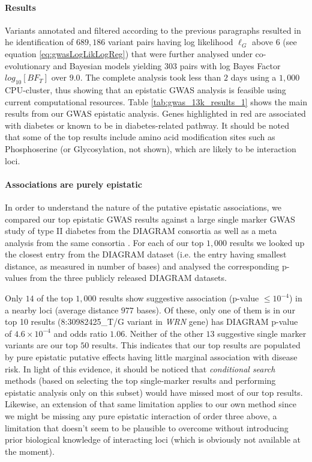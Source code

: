 \paragraph{Results}
Variants annotated and filtered according to the previous paragraphs resulted in he identification of  $689,186$ variant pairs having log likelihood $\ell_G$ above $6$ (see equation \ref{eq:gwasLogLikLogReg}) that were further analysed under co-evolutionary and Bayesian models yielding $303$ pairs with log Bayes Factor $log_10[BF_T]$ over $9.0$. 
The complete analysis took less than $2$ days using a $1,000$ CPU-cluster, thus showing that an epistatic GWAS analysis is feasible using current computational resources. 
Table \ref{tab:gwas_13k_results_1} shows the main results from our GWAS epistatic analysis.
Genes highlighted in red are associated with diabetes or known to be in diabetes-related pathway. 
It should be noted that some of the top results include amino acid modification sites such as Phosphoserine (or Glycosylation, not shown), which are likely to be interaction loci.

\paragraph{Associations are purely epistatic}
In order to understand the nature of the putative epistatic associations, we compared our top epistatic GWAS results against a large single marker GWAS study of type II diabetes from the DIAGRAM consortia \cite{zeggini2008meta,voight2010twelve} as well as a meta analysis from the same consortia \cite{morris2012large}.
For each of our top $1,000$ results we looked up the closest entry from the DIAGRAM dataset (i.e. the entry having smallest distance, as measured in number of bases) and analysed the corresponding p-values from the three publicly released DIAGRAM datasets.

Only $14$ of the top $1,000$ results show suggestive association (p-value $\le 10^{-4}$) in a nearby loci (average distance $977$ bases).
Of these, only one of them is in our top 10 results (8:30982425\_T/G variant in \textit{WRN} gene) has DIAGRAM p-value of $4.6 \times 10^{-4}$ and odds ratio $1.06$.
Neither of the other $13$ suggestive single marker variants are our top $50$ results.
This indicates that our top results are populated by pure epistatic putative effects having little marginal association with disease risk.
In light of this evidence, it should be noticed that \textit{conditional search} methods (based on selecting the top single-marker results and performing epistatic analysis only on this subset) would have missed most of our top results.
Likewise, an extension of that same limitation applies to our own method since we might be missing any pure epistatic interaction of order three above, a limitation that doesn't seem to be plausible to overcome without introducing prior biological knowledge of interacting loci (which is obviously not available at the moment).

